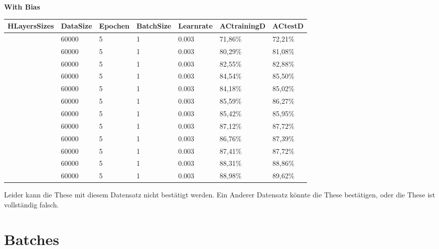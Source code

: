 \documentclass[12pt]{article}
\begin{document}
\begin{table}[H]
    \centering
    \textbf{With Bias}
    \begin{tabular}{|l|l|l|l|l|l|l|}
    \hline
        HLayersSizes & DataSize & Epochen & BatchSize & Learnrate & ACtrainingD & ACtestD \\ \hline
        [784, 10, 10] & 60000 & 5 & 1 & 0.003 & 71,86\% & 72,21\% \\ \hline
        [784, 20, 10] & 60000 & 5 & 1 & 0.003 & 80,29\% & 81,08\% \\ \hline
        [784, 30, 10] & 60000 & 5 & 1 & 0.003 & 82,55\% & 82,88\% \\ \hline
        [784, 40, 10] & 60000 & 5 & 1 & 0.003 & 84,54\% & 85,50\% \\ \hline
        [784, 50, 10] & 60000 & 5 & 1 & 0.003 & 84,18\% & 85,02\% \\ \hline
        [784, 60, 10] & 60000 & 5 & 1 & 0.003 & 85,59\% & 86,27\% \\ \hline
        [784, 70, 10] & 60000 & 5 & 1 & 0.003 & 85,42\% & 85,95\% \\ \hline
        [784, 80, 10] & 60000 & 5 & 1 & 0.003 & 87,12\% & 87,72\% \\ \hline
        [784, 90, 10] & 60000 & 5 & 1 & 0.003 & 86,76\% & 87,39\% \\ \hline
        [784, 100, 10] & 60000 & 5 & 1 & 0.003 & 87,41\% & 87,72\% \\ \hline
        [784, 150, 10] & 60000 & 5 & 1 & 0.003 & 88,31\% & 88,86\% \\ \hline
        [784, 200, 10] & 60000 & 5 & 1 & 0.003 & 88,98\% & 89,62\% \\ \hline
    \end{tabular}
\end{table}
Leider kann die These mit diesem Datensatz nicht bestätigt werden. Ein Anderer Datensatz könnte die These bestätigen, oder die These ist vollständig falsch.
\section{ Batches}
\end{document}
